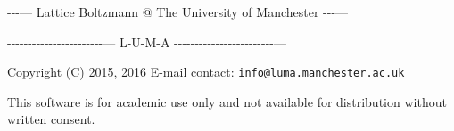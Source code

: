 



-\/-\/-\/--- Lattice Boltzmann @ The University of Manchester -\/-\/-\/---

-\/-\/-\/-\/-\/-\/-\/-\/-\/-\/-\/-\/-\/-\/-\/-\/-\/-\/-\/-\/-\/-\/-\/--- L-\/\+U-\/\+M-\/A -\/-\/-\/-\/-\/-\/-\/-\/-\/-\/-\/-\/-\/-\/-\/-\/-\/-\/-\/-\/-\/-\/-\/-\/---

Copyright (C) 2015, 2016 E-\/mail contact\+: \href{mailto:info@luma.manchester.ac.uk}{\tt info@luma.\+manchester.\+ac.\+uk}

This software is for academic use only and not available for distribution without written consent. 